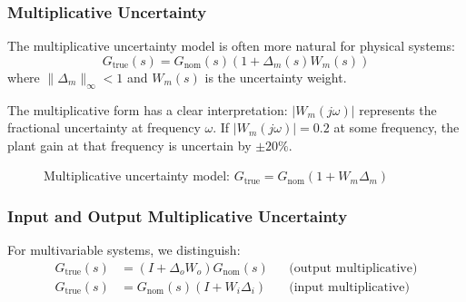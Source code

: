 \subsubsection{Multiplicative Uncertainty}

The multiplicative uncertainty model is often more natural for physical systems:
\begin{equation}
G_{\text{true}}(s) = G_{\text{nom}}(s)(1 + \Delta_m(s) W_m(s))
\label{eq:multiplicative}
\end{equation}
where $\|\Delta_m\|_\infty < 1$ and $W_m(s)$ is the uncertainty weight.

The multiplicative form has a clear interpretation: $|W_m(j\omega)|$ represents the fractional uncertainty at frequency $\omega$. If $|W_m(j\omega)| = 0.2$ at some frequency, the plant gain at that frequency is uncertain by $\pm 20\%$.

\begin{figure}[htbp]
\centering
{}
\caption{Multiplicative uncertainty model: $G_{\text{true}} = G_{\text{nom}}(1 + W_m\Delta_m)$}
\label{fig:multiplicative}
\end{figure}

\subsubsection{Input and Output Multiplicative Uncertainty}

For multivariable systems, we distinguish:
\begin{align}
G_{\text{true}}(s) &= (I + \Delta_o W_o) G_{\text{nom}}(s) && \text{(output multiplicative)} \\
G_{\text{true}}(s) &= G_{\text{nom}}(s) (I + W_i \Delta_i) && \text{(input multiplicative)}
\end{align}


